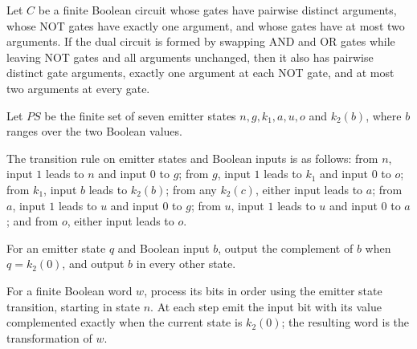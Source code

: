 \begin{theorem}
\label{BoolCircuit.DAGCircuit.IsFaninTwo.dual}
\leanok
{}
Let $C$ be a finite Boolean circuit whose gates have pairwise distinct arguments, whose
NOT gates have exactly one argument, and whose gates have at most two arguments. If the
dual circuit is formed by swapping AND and OR gates while leaving NOT gates and all
arguments unchanged, then it also has pairwise distinct gate arguments, exactly one
argument at each NOT gate, and at most two arguments at every gate.
\end{theorem}

\begin{definition}
\label{BoolCircuit.CktSatReduction.Emitter.PS}
\leanok
Let $PS$ be the finite set of seven emitter states $n,g,k_1,a,u,o$ and $k_2(b)$, where
$b$ ranges over the two Boolean values.
\end{definition}

\begin{definition}
\label{BoolCircuit.CktSatReduction.Emitter.psNext}
\leanok
{}
The transition rule on emitter states and Boolean inputs is as follows: from $n$, input
$1$ leads to $n$ and input $0$ to $g$; from $g$, input $1$ leads to $k_1$ and input $0$
to $o$; from $k_1$, input $b$ leads to $k_2(b)$; from any $k_2(c)$, either input leads
to $a$; from $a$, input $1$ leads to $u$ and input $0$ to $g$; from $u$, input $1$ leads
to $u$ and input $0$ to $a$; and from $o$, either input leads to $o$.
\end{definition}

\begin{definition}
\label{BoolCircuit.CktSatReduction.Emitter.swapBit}
\leanok
{}
For an emitter state $q$ and Boolean input $b$, output the complement of $b$ when
$q=k_2(0)$, and output $b$ in every other state.
\end{definition}

\begin{definition}
\label{BoolCircuit.CktSatReduction.swapKinds}
\leanok
{}
For a finite Boolean word $w$, process its bits in order using the emitter state
transition, starting in state $n$. At each step emit the input bit with its value
complemented exactly when the current state is $k_2(0)$; the resulting word is the
transformation of $w$.
\end{definition}

